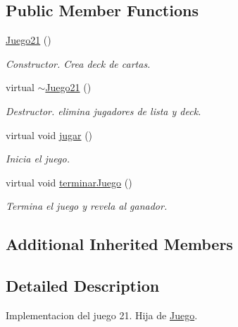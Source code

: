 \subsection*{Public Member Functions}
\begin{DoxyCompactItemize}
\item 
\hyperlink{class_juego21_af427a46cb9e06d7e8e3ca07281e899ef}{Juego21} ()\hypertarget{class_juego21_af427a46cb9e06d7e8e3ca07281e899ef}{}\label{class_juego21_af427a46cb9e06d7e8e3ca07281e899ef}

\begin{DoxyCompactList}\small\item\em Constructor. Crea deck de cartas. \end{DoxyCompactList}\item 
virtual \hyperlink{class_juego21_af427a347e1b7c3c12fdd4c476c61656a}{$\sim$\+Juego21} ()\hypertarget{class_juego21_af427a347e1b7c3c12fdd4c476c61656a}{}\label{class_juego21_af427a347e1b7c3c12fdd4c476c61656a}

\begin{DoxyCompactList}\small\item\em Destructor. elimina jugadores de lista y deck. \end{DoxyCompactList}\item 
virtual void \hyperlink{class_juego21_a5b450c7b4e68d1741e3e7ed9808d4667}{jugar} ()\hypertarget{class_juego21_a5b450c7b4e68d1741e3e7ed9808d4667}{}\label{class_juego21_a5b450c7b4e68d1741e3e7ed9808d4667}

\begin{DoxyCompactList}\small\item\em Inicia el juego. \end{DoxyCompactList}\item 
virtual void \hyperlink{class_juego21_a5bf192fbb3bbd76717600d307065cbea}{terminar\+Juego} ()\hypertarget{class_juego21_a5bf192fbb3bbd76717600d307065cbea}{}\label{class_juego21_a5bf192fbb3bbd76717600d307065cbea}

\begin{DoxyCompactList}\small\item\em Termina el juego y revela al ganador. \end{DoxyCompactList}\end{DoxyCompactItemize}
\subsection*{Additional Inherited Members}


\subsection{Detailed Description}
Implementacion del juego 21. Hija de \hyperlink{class_juego}{Juego}. 


